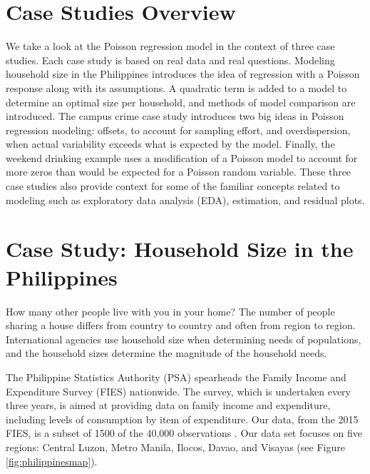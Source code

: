 \documentclass[
]{krantz}
\begin{document}
\section{Case Studies Overview}\label{case-studies-overview}

We take a look at the Poisson regression model in the context of three case studies. Each case study is based on real data and real questions. Modeling household size in the Philippines introduces the idea of regression with a Poisson response along with its assumptions. A quadratic term is added to a model to determine an optimal size per household, and methods of model comparison are introduced. The campus crime case study introduces two big ideas in Poisson regression modeling: offsets, to account for sampling effort, and overdispersion, when actual variability exceeds what is expected by the model. Finally, the weekend drinking example uses a modification of a Poisson model to account for more zeros than would be expected for a Poisson random variable. These three case studies also provide context for some of the familiar concepts related to modeling such as exploratory data analysis (EDA), estimation, and residual plots.

\section{Case Study: Household Size in the Philippines}\label{cs-philippines}

How many other people live with you in your home? The number of people sharing a house differs from country to country and often from region to region. International agencies use household size when determining needs of populations, and the household sizes determine the magnitude of the household needs.

The Philippine Statistics Authority (PSA) spearheads the Family Income and Expenditure Survey (FIES) nationwide. The survey, which is undertaken every three years, is aimed at providing data on family income and expenditure, including levels of consumption by item of expenditure. Our data, from the 2015 FIES, is a subset of 1500 of the 40,000 observations \citep{PSA}. Our data set focuses on five regions: Central Luzon, Metro Manila, Ilocos, Davao, and Visayas (see Figure \ref{fig:philippinesmap}).
\end{document}

